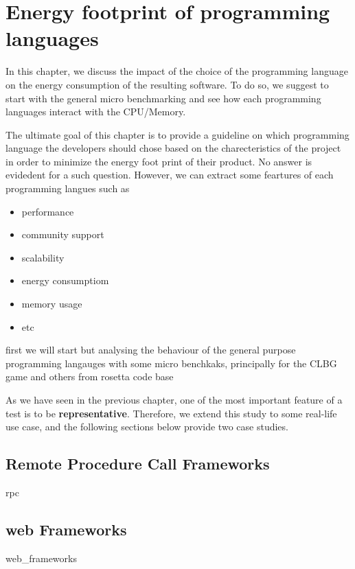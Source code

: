 \chapter{Energy footprint of programming languages}
\label{chapter:porgramming_langauges}
In this chapter, we discuss the impact of the choice of the programming language on the energy consumption of the resulting software.
To do so, we suggest to start with the general micro benchmarking and see how each programming languages interact with the CPU/Memory.

The ultimate goal of this chapter is to provide a guideline on which programming language the developers should chose based on the charecteristics of the project in order to minimize the energy foot print of their product.
No answer is evidedent for a such question. However, we can extract some feartures of each programming langues such as
\begin{itemize}
    \item performance
    \item community support
    \item scalability
    \item energy consumptiom
    \item memory usage
    \item etc
\end{itemize}

first we will start but analysing the behaviour of the general purpose programming langauges with some micro benchkaks, principally for the CLBG game and others from rosetta code base


As we have seen in the previous chapter, one of the most important feature of a test is to be \textbf{representative}.
Therefore, we extend this study to some real-life use case, and the following sections below provide two case studies.
\section{Remote Procedure Call Frameworks}
{rpc}
\section{web Frameworks}
{web_frameworks}